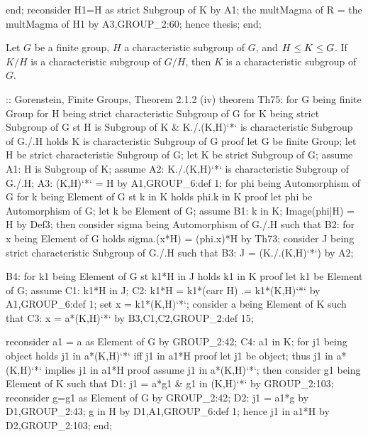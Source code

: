   end;
  reconsider H1=H as strict Subgroup of K by A1;
  the multMagma of R = the multMagma of H1 by A3,GROUP_2:60;
  hence thesis;
end;
\eatline
{}\nwendcode{}\nwdocspar
\begin{theorem}
Let $G$ be a finite group, $H$ a characteristic subgroup of $G$, and
$H\leq K\leq G$. If $K/H$ is a characteristic subgroup of $G/H$,
then $K$ is a characteristic subgroup of $G$.
\end{theorem}

\nwenddocs{}\endmoddef\nwstartdeflinemarkup{}\nwenddeflinemarkup
:: Gorenstein, Finite Groups, Theorem 2.1.2 (iv)
theorem Th75:
  for G being finite Group
  for H being strict characteristic Subgroup of G
  for K being strict Subgroup of G
  st H is Subgroup of K &
  K./.(K,H)`*` is characteristic Subgroup of G./.H
  holds K is characteristic Subgroup of G
proof
  let G be finite Group;
  let H be strict characteristic Subgroup of G;
  let K be strict Subgroup of G;
  assume A1: H is Subgroup of K;
  assume A2: K./.(K,H)`*` is characteristic Subgroup of G./.H;
  A3: (K,H)`*` = H by A1,GROUP_6:def 1;
  for phi being Automorphism of G
  for k being Element of G st k in K
  holds phi.k in K
  proof
    let phi be Automorphism of G;
    let k be Element of G;
    assume B1: k in K;
    Image(phi|H) = H by Def3;
    then consider sigma being Automorphism of G./.H such that
    B2: for x being Element of G holds sigma.(x*H) = (phi.x)*H
    by Th73;
    consider J being strict characteristic Subgroup of G./.H such that
    B3: J = (K./.(K,H)`*`) by A2;

    B4: for k1 being Element of G st k1*H in J holds k1 in K
    proof
      let k1 be Element of G;
      assume C1: k1*H in J;
      C2: k1*H = k1*(carr H)
              .= k1*(K,H)`*` by A1,GROUP_6:def 1;
      set x = k1*(K,H)`*`;
      consider a being Element of K such that
      C3: x = a*(K,H)`*` by B3,C1,C2,GROUP_2:def 15;

      reconsider a1 = a as Element of G by GROUP_2:42;
      C4: a1 in K;
      for j1 being object holds j1 in a*(K,H)`*` iff j1 in a1*H
      proof
        let j1 be object;
        thus j1 in a*(K,H)`*` implies j1 in a1*H
        proof
          assume j1 in a*(K,H)`*`;
          then consider g1 being Element of K such that
          D1: j1 = a*g1 & g1 in (K,H)`*` by GROUP_2:103;
          reconsider g=g1 as Element of G by GROUP_2:42;
          D2: j1 = a1*g by D1,GROUP_2:43;
          g in H by D1,A1,GROUP_6:def 1;
          hence j1 in a1*H by D2,GROUP_2:103;
        end;

